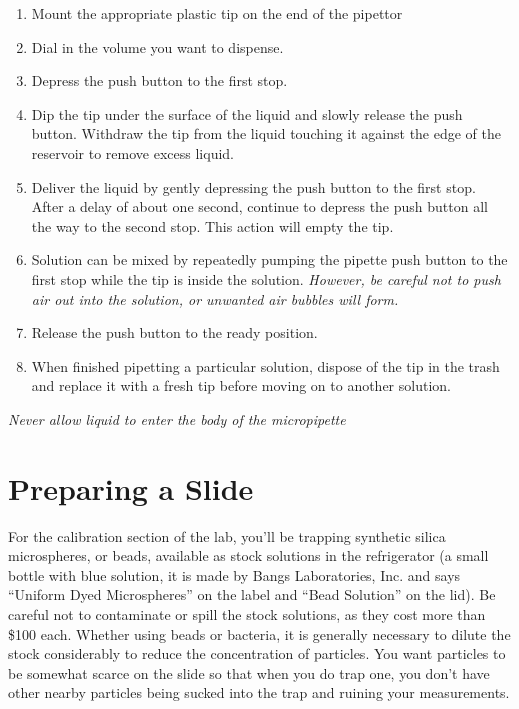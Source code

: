\documentclass{../lab}
\begin{document}
\begin{enumerate}
    \item Mount the appropriate plastic tip on the end of the pipettor

    \item Dial in the volume you want to dispense.

    \item Depress the push button to the first stop.

    \item Dip the tip under the surface of the liquid and slowly release the push button. Withdraw the tip from the liquid touching it against the edge of the reservoir to remove excess liquid.

    \item Deliver the liquid by gently depressing the push button to the first stop. After a delay of about one second, continue to depress the push button all the way to the second stop. This action will empty the tip.

    \item Solution can be mixed by repeatedly pumping the pipette push button to the first stop while the tip is inside the solution. \emph{However, be careful not to push air out into the solution, or unwanted air bubbles will form.}

    \item Release the push button to the ready position.

    \item When finished pipetting a particular solution, dispose of the tip in the trash and replace it with a fresh tip before moving on to another solution.

\end{enumerate}

\emph{Never allow liquid to enter the body of the micropipette}

\section{Preparing a Slide}

For the calibration section of the lab, you'll be trapping synthetic silica microspheres, or beads, available as stock solutions in the refrigerator (a small bottle with blue solution, it is made by Bangs Laboratories, Inc. and says ``Uniform Dyed Microspheres'' on the label and ``Bead Solution'' on the lid). Be careful not to contaminate or spill the stock solutions, as they cost more than \$100 each. Whether using beads or bacteria, it is generally necessary to dilute the stock considerably to reduce the concentration of particles. You want particles to be somewhat scarce on the slide so that when you do trap one, you don't have other nearby particles being sucked into the trap and ruining your measurements.
\end{document}
